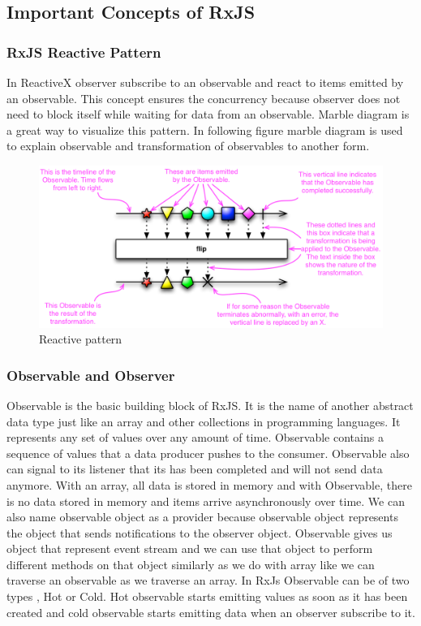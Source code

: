 \subsection{Important Concepts of RxJS}
\subsubsection{RxJS Reactive Pattern}
In ReactiveX observer subscribe to an observable and react to items emitted by an observable. This concept ensures the concurrency because observer does not need to block itself while waiting for data from an observable. Marble diagram is a great way to visualize this pattern. In following figure marble diagram is used to explain observable and transformation of observables to another form.

\begin{figure}[!h]
	\centering
	\includegraphics[scale=0.5,trim=0 0 0 0]{gfx/rxjs-reactive-pattern2.png}
	\caption{Reactive pattern}
\end{figure}

\subsubsection{Observable and Observer}
Observable is the basic building block of RxJS. It is the name of another abstract data type just like an array and other collections in programming languages. It represents any set of values over any amount of time. Observable contains a sequence of values that a data producer pushes to the consumer. Observable also can signal to its listener that its has been completed and will not send data anymore. With an array, all data is stored in memory and with Observable, there is no data stored in memory and items arrive asynchronously over time. We can also name observable object as a provider because observable object represents the object that sends notifications to the observer object.
Observable gives us object that represent event stream and we can use that object to perform different methods on that object similarly as we do with array like we can traverse an observable as we traverse an array. In RxJs Observable can be of two types , Hot or Cold. Hot observable starts emitting values as soon as it has been created and cold observable starts emitting data when an observer subscribe to it.

